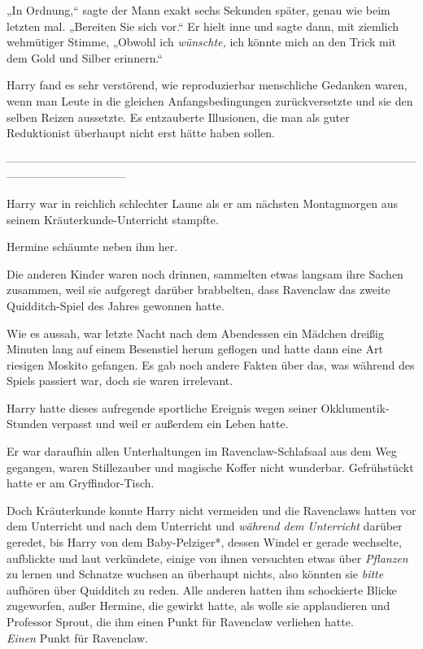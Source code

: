 {„In Ordnung,“ sagte der Mann exakt sechs Sekunden später, genau wie beim letzten mal. „Bereiten Sie sich vor.“ Er hielt inne und sagte dann, mit ziemlich wehmütiger Stimme, „Obwohl ich \emph{wünschte,} ich könnte mich an den Trick mit dem Gold und Silber erinnern.“

Harry fand es sehr verstörend, wie reproduzierbar menschliche Gedanken waren, wenn man Leute in die gleichen Anfangsbedingungen zurückversetzte und sie den selben Reizen aussetzte. Es entzauberte Illusionen, die man als guter Reduktionist überhaupt nicht erst hätte haben sollen.

--------------------------------------------------------------------------------------------------------------------------------------------

\hfill\break Harry war in reichlich schlechter Laune als er am nächsten Montagmorgen aus seinem Kräuterkunde-Unterricht stampfte.

Hermine schäumte neben ihm her.

Die anderen Kinder waren noch drinnen, sammelten etwas langsam ihre Sachen zusammen, weil sie aufgeregt darüber brabbelten, dass Ravenclaw das zweite Quidditch-Spiel des Jahres gewonnen hatte.

Wie es aussah, war letzte Nacht nach dem Abendessen ein Mädchen dreißig Minuten lang auf einem Besenstiel herum geflogen und hatte dann eine Art riesigen Moskito gefangen. Es gab noch andere Fakten über das, was während des Spiels passiert war, doch sie waren irrelevant.

Harry hatte dieses aufregende sportliche Ereignis wegen seiner Okklumentik-Stunden verpasst und weil er außerdem ein Leben hatte.

Er war daraufhin allen Unterhaltungen im Ravenclaw-Schlafsaal aus dem Weg gegangen, waren Stillezauber und magische Koffer nicht wunderbar. Gefrühstückt hatte er am Gryffindor-Tisch.

Doch Kräuterkunde konnte Harry nicht vermeiden und die Ravenclaws hatten vor dem Unterricht und nach dem Unterricht und \emph{während dem} \emph{Unterricht} darüber geredet, bis Harry von dem Baby-Pelziger*, dessen Windel er gerade wechselte, aufblickte und laut verkündete, einige von ihnen versuchten etwas über \emph{Pflanzen} zu lernen und Schnatze wuchsen an überhaupt nichts, also könnten sie \emph{bitte} aufhören über Quidditch zu reden. Alle anderen hatten ihm schockierte Blicke zugeworfen, außer Hermine, die gewirkt hatte, als wolle sie applaudieren und Professor Sprout, die ihm einen Punkt für Ravenclaw verliehen hatte.\\ \emph{Einen} Punkt für Ravenclaw.

}
